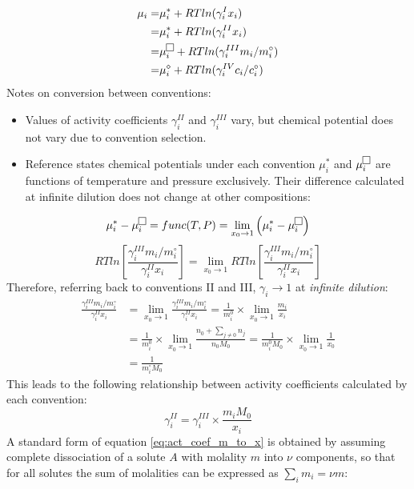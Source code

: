 \documentclass[onecolumn]{article}
\begin{document}
\begin{equation}
\begin{aligned}
\mu_i = & \mu_i^{*} + RTln(\gamma_i^{I} x_i) \\
	= 	& \mu_i^{*} + RTln(\gamma_i^{II} x_i) \\
	=	& \mu_i^{\fbox{}} + RTln(\gamma_i^{III} m_i/m_i^{\circ}) \\
	= 	& \mu_i^{\diamond} + RTln(\gamma_i^{IV} c_i/c_i^{\circ})
\end{aligned}
\end{equation}
Notes on conversion between conventions:
\begin{itemize}
\item Values of activity coefficients $\gamma_i^{II}$ and $\gamma_i^{III}$ vary, but chemical potential does not vary due to convention selection.
\item Reference states chemical potentials under each convention $\mu_i^{*}$ and $\mu_i^{\fbox{}}$  are functions of temperature and pressure exclusively. Their difference calculated at infinite dilution does not change at other compositions:
\end{itemize}
\[
\mu_i^{*} - \mu_i^{\fbox{}}  =  func(T,P) =  \lim_{x_0 \to 1} \left( \mu_i^{*} - \mu_i^{\fbox{}}\right)
\]
\[
RTln\left[ \frac{\gamma_i^{III} m_i/m_i^{\circ}}{\gamma_i^{II} x_i}\right] = \lim_{x_0 \to 1} RTln\left[ \frac{\gamma_i^{III} m_i/m_i^{\circ}}{\gamma_i^{II} x_i}\right]
\]
Therefore, referring back to conventions II and III, $\gamma_i \rightarrow 1$ at \textit{infinite dilution}:
\[
\begin{aligned}
\frac{\gamma_i^{III} m_i/m_i^{\circ}}{\gamma_i^{II} x_i} & = \lim_{x_0 \to 1} \frac{\gamma_i^{III} m_i/m_i^{\circ}}{\gamma_i^{II} x_i} = \frac{1}{m_i^0} \times \lim_{x_0 \to 1} \frac{m_i}{x_i} \\
& = \frac{1}{m_i^0} \times \lim_{x_0 \to 1} \frac{n_0+\sum_{j \neq 0}n_j}{n_0 M_0} = \frac{1}{m_i^0 M_0} \times \lim_{x_0 \to 1} \frac{1}{x_0} \\
& = \frac{1}{m_i^\circ M_0}
\end{aligned}
\]
This leads to the following relationship between activity coefficients calculated by each convention:
\begin{equation}
\label{eq:act_coef_m_to_x}
\gamma_i^{II} = \gamma_i^{III} \times \frac{m_i M_0}{x_i}
\end{equation}
A standard form of equation \ref{eq:act_coef_m_to_x} is obtained by assuming complete dissociation of a solute $A$ with molality $m$ into $\nu$ components, so that for all solutes the sum of molalities can be expressed as $\sum_{i}m_i = \nu m $:
\end{document}
